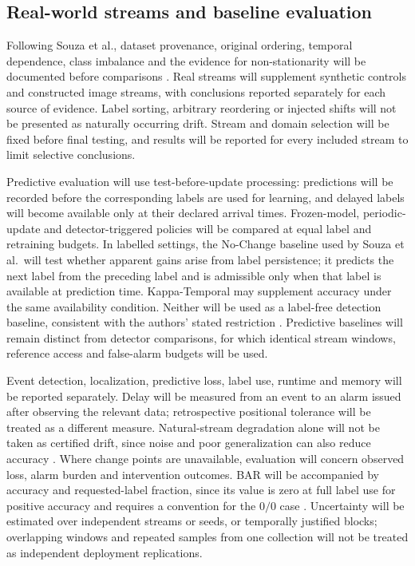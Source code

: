 \documentclass[10pt,a4paper]{article}
\begin{document}
\subsection{Real-world streams and baseline evaluation}
Following Souza et al., dataset provenance, original ordering, temporal dependence, class imbalance and the evidence for non-stationarity will be documented before comparisons \cite[Secs.~3--4]{souza2020}. Real streams will supplement synthetic controls and constructed image streams, with conclusions reported separately for each source of evidence. Label sorting, arbitrary reordering or injected shifts will not be presented as naturally occurring drift. Stream and domain selection will be fixed before final testing, and results will be reported for every included stream to limit selective conclusions.

Predictive evaluation will use test-before-update processing: predictions will be recorded before the corresponding labels are used for learning, and delayed labels will become available only at their declared arrival times. Frozen-model, periodic-update and detector-triggered policies will be compared at equal label and retraining budgets. In labelled settings, the No-Change baseline used by Souza et al.\ will test whether apparent gains arise from label persistence; it predicts the next label from the preceding label and is admissible only when that label is available at prediction time. Kappa-Temporal may supplement accuracy under the same availability condition. Neither will be used as a label-free detection baseline, consistent with the authors' stated restriction \cite[Sec.~4.2]{souza2020}. Predictive baselines will remain distinct from detector comparisons, for which identical stream windows, reference access and false-alarm budgets will be used.

Event detection, localization, predictive loss, label use, runtime and memory will be reported separately. Delay will be measured from an event to an alarm issued after observing the relevant data; retrospective positional tolerance will be treated as a different measure. Natural-stream degradation alone will not be taken as certified drift, since noise and poor generalization can also reduce accuracy \cite[Sec.~4.1]{souza2020}. Where change points are unavailable, evaluation will concern observed loss, alarm burden and intervention outcomes. BAR will be accompanied by accuracy and requested-label fraction, since its value is zero at full label use for positive accuracy and requires a convention for the $0/0$ case \cite[Eq.~5]{assis}. Uncertainty will be estimated over independent streams or seeds, or temporally justified blocks; overlapping windows and repeated samples from one collection will not be treated as independent deployment replications.
\end{document}
